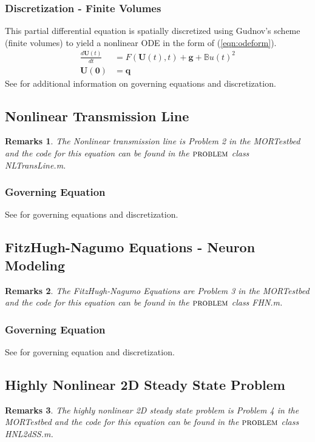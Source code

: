 \documentclass[notitlepage]{report}
\newtheorem*{Rem}{Remarks}
\newcommand{\problem}{\ensuremath{\textsc{problem }}}
\begin{document}
\subsubsection{Discretization - Finite Volumes}
This partial differential equation is spatially discretized using Gudnov's scheme (finite volumes) to yield a nonlinear ODE in the form of (\ref{eqn:odeform}).
\begin{align}%
\frac{d \mathbf{U}(t)}{d t} &= F(\mathbf{U}(t), t) + \mathbf{g} + \mathbb{B}u(t)^2 \\
 \mathbf{U(0)} &= \mathbf{q}
\end{align}
See \cite{rewienski2003trajectory} for additional information on governing equations and discretization.

\subsection{Nonlinear Transmission Line}
\begin{Rem}
The Nonlinear transmission line is Problem 2 in the MORTestbed and the code for this equation can be found in the \problem class NLTransLine.m.
\end{Rem}
\subsubsection{Governing Equation}
See \cite{rewienski2003trajectory} for governing equations and discretization.

\subsection{FitzHugh-Nagumo Equations - Neuron Modeling}
\begin{Rem}
The FitzHugh-Nagumo Equations are Problem 3 in the MORTestbed and the code for this equation can be found in the \problem class FHN.m.
\end{Rem}
\subsubsection{Governing Equation}
See \cite{chaturantabut2009discrete} for governing equation and discretization.

\subsection{Highly Nonlinear 2D Steady State Problem}
\begin{Rem}
The highly nonlinear 2D steady state problem is Problem 4 in the MORTestbed and the code for this equation can be found in the \problem class HNL2dSS.m.
\end{Rem}
\end{document}
